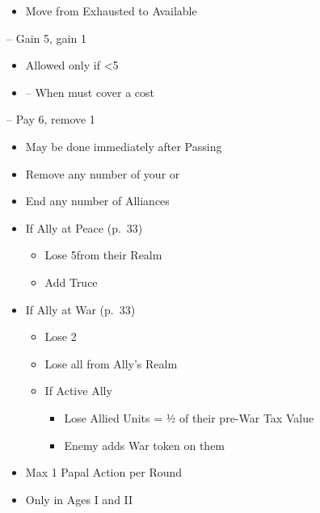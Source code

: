 \documentclass[10pt]{article}
\begin{document}
\begin{itemize}
	\item Move \manpower from Exhausted to Available
\end{itemize}

 -- Gain 5\ducats, gain 1\interest
\begin{itemize}
	\item Allowed only if <5\interest
	\item \reaction -- When must cover a cost
\end{itemize}
 -- Pay 6\ducats, remove 1\interest
\begin{itemize}
	\item May be done immediately after Passing
\end{itemize}

\begin{itemize}
	\item Remove any number of your \influence or \claims
	\item End any number of Alliances
	\item If Ally at Peace (p.~33)
	\begin{itemize}
		\item Lose 5\influence from their Realm
		\item Add Truce
	\end{itemize}
	\item If Ally at War (p.~33)
	\begin{itemize}
		\item Lose 2\stability
		\item Lose all \influence from Ally's Realm
		\item If Active Ally
		\begin{itemize}
			\item Lose Allied Units = ½ of their pre-War Tax Value
			\item Enemy adds War token on them
		\end{itemize}
	\end{itemize}
\end{itemize}

\framebreak %
\begin{itemize}
	\item Max 1 Papal Action per Round
	\item Only in Ages I and II
\end{itemize}
\end{document}
